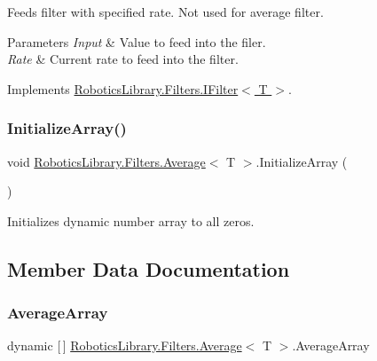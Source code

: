Feeds filter with specified rate. Not used for average filter. 


\begin{DoxyParams}{Parameters}
{\em Input} & Value to feed into the filer.\\
\hline
{\em Rate} & Current rate to feed into the filter.\\
\hline
\end{DoxyParams}


Implements \hyperlink{interface_robotics_library_1_1_filters_1_1_i_filter_a24d363fb2957923a256448e04634d9ca}{Robotics\+Library.\+Filters.\+I\+Filter$<$ T $>$}.

\mbox{\label{class_robotics_library_1_1_filters_1_1_average_af2d308005d9067a43cbb9968147b26dd}} 
\subsubsection{\texorpdfstring{Initialize\+Array()}{InitializeArray()}}
{\footnotesize\ttfamily void \hyperlink{class_robotics_library_1_1_filters_1_1_average}{Robotics\+Library.\+Filters.\+Average}$<$ T $>$.Initialize\+Array (\begin{DoxyParamCaption}{ }\end{DoxyParamCaption})\hspace{0.3cm}{\ttfamily [private]}}



Initializes dynamic number array to all zeros.



\subsection{Member Data Documentation}
\mbox{\label{class_robotics_library_1_1_filters_1_1_average_abed97fe2d89a039ac76c7db768904fd5}} 
\subsubsection{\texorpdfstring{Average\+Array}{AverageArray}}
{\footnotesize\ttfamily dynamic \mbox{[}$\,$\mbox{]} \hyperlink{class_robotics_library_1_1_filters_1_1_average}{Robotics\+Library.\+Filters.\+Average}$<$ T $>$.Average\+Array\hspace{0.3cm}{\ttfamily [private]}}


